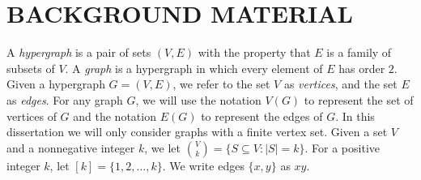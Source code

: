 \documentclass[oneside,12pt]{memoir}
\begin{document}
\tableofcontents

\listoffigures  %




\mainmatter
\pagestyle{asu}


\pagestyle{plain} 



\chapter{BACKGROUND MATERIAL}

\DoubleSpacing
\setlength{\parindent}{.5in}

A \emph{hypergraph} is a pair of sets $(V,E)$ with the property that $E$ is a family of subsets of $V$.  A \emph{graph} is a hypergraph in which every element of $E$ has order $2$.  Given a hypergraph $G=(V,E)$, we refer to the set $V$ as \emph{vertices}, and the set $E$ as \emph{edges}.  For any graph $G$, we will use the notation $V(G)$ to represent the set of vertices of $G$ and the notation $E(G)$ to represent the edges of $G$.  In this dissertation we will only consider graphs with a finite vertex set.  Given a set $V$ and a nonnegative integer $k$, we let $\binom{V}{k}=\{S\subseteq V:|S|=k\}$.  For a positive integer $k$, let $[k]=\{1,2,\dots, k\}$.  We write edges $\{x,y\}$ as $xy$.  
\end{document}
